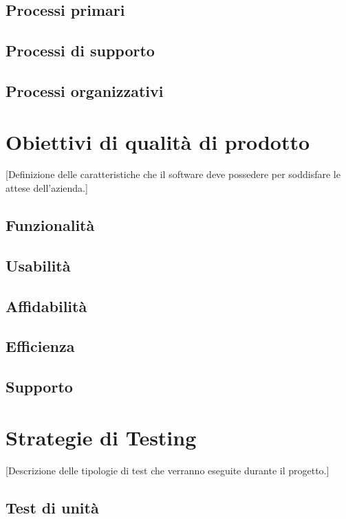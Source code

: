 \documentclass[12pt, a4paper]{article}
\begin{document}
\subsection{Processi primari}

\subsection{Processi di supporto}

\subsection{Processi organizzativi}



\section{Obiettivi di qualità di prodotto}
[Definizione delle caratteristiche che il software deve possedere per soddisfare le attese dell'azienda.]

\subsection{Funzionalità}

\subsection{Usabilità}

\subsection{Affidabilità}

\subsection{Efficienza}

\subsection{Supporto}



\section{Strategie di Testing}
[Descrizione delle tipologie di test che verranno eseguite durante il progetto.]

\subsection{Test di unità}
\end{document}
